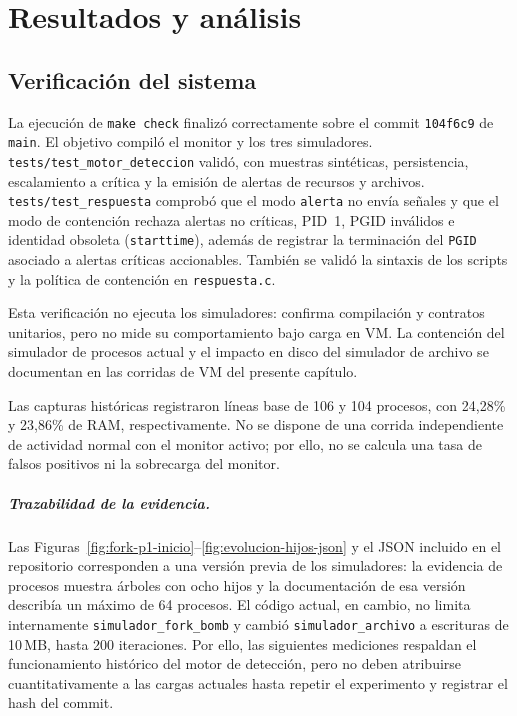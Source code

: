\chapter{Resultados y análisis}

\section{Verificación del sistema}

La ejecución de \texttt{make check} finalizó correctamente sobre el commit
\texttt{104f6c9} de \texttt{main}. El objetivo compiló el monitor y los tres
simuladores. \texttt{tests/test\_motor\_deteccion} validó, con muestras
sintéticas, persistencia, escalamiento a crítica y la emisión de alertas de
recursos y archivos. \texttt{tests/test\_respuesta} comprobó que el modo \texttt{alerta} no envía
señales y que el modo de contención rechaza alertas no críticas, PID~1, PGID
inválidos e identidad obsoleta (\texttt{starttime}), además de registrar la
terminación del \texttt{PGID} asociado a alertas críticas accionables. También se
validó la sintaxis de los scripts y la política de contención en
\texttt{respuesta.c}.

Esta verificación no ejecuta los simuladores: confirma compilación y contratos
unitarios, pero no mide su comportamiento bajo carga en VM. La contención del
simulador de procesos actual y el impacto en disco del simulador de archivo se
documentan en las corridas de VM del presente capítulo.

Las capturas históricas registraron líneas base de 106 y 104 procesos, con 24,28\% y
23,86\% de RAM, respectivamente. No se dispone de una corrida independiente de
actividad normal con el monitor activo; por ello, no se calcula una tasa de
falsos positivos ni la sobrecarga del monitor.

\paragraph{Trazabilidad de la evidencia.}
Las Figuras~\ref{fig:fork-p1-inicio}--\ref{fig:evolucion-hijos-json} y el JSON
incluido en el repositorio corresponden a una versión previa de los simuladores:
la evidencia de procesos muestra árboles con ocho hijos y la documentación de
esa versión describía un máximo de 64 procesos. El código actual, en cambio, no
limita internamente \texttt{simulador\_fork\_bomb} y cambió
\texttt{simulador\_archivo} a escrituras de 10\,MB, hasta 200 iteraciones.
Por ello, las siguientes mediciones respaldan el funcionamiento histórico del
motor de detección, pero no deben atribuirse cuantitativamente a las cargas
actuales hasta repetir el experimento y registrar el hash del commit.

